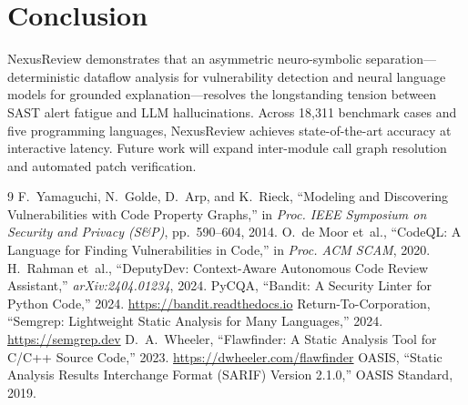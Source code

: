\documentclass[10pt,conference]{IEEEtran}
\begin{document}
\section{Conclusion}

NexusReview demonstrates that an asymmetric neuro-symbolic separation—deterministic dataflow analysis for vulnerability detection and neural language models for grounded explanation—resolves the longstanding tension between SAST alert fatigue and LLM hallucinations. Across 18{,}311 benchmark cases and five programming languages, NexusReview achieves state-of-the-art accuracy at interactive latency. Future work will expand inter-module call graph resolution and automated patch verification.

\begin{thebibliography}{9}
 F.~Yamaguchi, N.~Golde, D.~Arp, and K.~Rieck, ``Modeling and Discovering Vulnerabilities with Code Property Graphs,'' in \emph{Proc. IEEE Symposium on Security and Privacy (S\&P)}, pp.~590--604, 2014.
 O.~de Moor et~al., ``CodeQL: A Language for Finding Vulnerabilities in Code,'' in \emph{Proc. ACM SCAM}, 2020.
 H.~Rahman et~al., ``DeputyDev: Context-Aware Autonomous Code Review Assistant,'' \emph{arXiv:2404.01234}, 2024.
 PyCQA, ``Bandit: A Security Linter for Python Code,'' 2024. \url{https://bandit.readthedocs.io}
 Return-To-Corporation, ``Semgrep: Lightweight Static Analysis for Many Languages,'' 2024. \url{https://semgrep.dev}
 D.~A.~Wheeler, ``Flawfinder: A Static Analysis Tool for C/C++ Source Code,'' 2023. \url{https://dwheeler.com/flawfinder}
 OASIS, ``Static Analysis Results Interchange Format (SARIF) Version 2.1.0,'' OASIS Standard, 2019.
\end{thebibliography}
\end{document}
